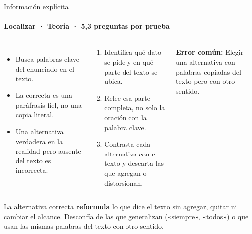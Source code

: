 \documentclass[aspectratio=169,11pt]{beamer}
\newlength{\ajustealto}
\newenvironment{ajustar}[1][0.74\textheight]
  {\setlength{\ajustealto}{#1}\begin{lrbox}{\ajustecaja}\begin{minipage}{\textwidth}}
  {\end{minipage}\end{lrbox}%
   \ifdim\dimexpr\ht\ajustecaja+\dp\ajustecaja\relax>\ajustealto
     \resizebox*{!}{\ajustealto}{\usebox{\ajustecaja}}\else\usebox{\ajustecaja}\fi}
\begin{document}
\begin{frame}{Información explícita}
\label{tema-cl-localizar}
\framesubtitle{Localizar · Teoría · 5,3 preguntas por prueba}
\begin{ajustar}
\begin{columns}[T,onlytextwidth]
\begin{itemize}\footnotesize
\item Busca palabras clave del enunciado en el texto.
\item La correcta es una paráfrasis fiel, no una copia literal.
\item Una alternativa verdadera en la realidad pero ausente del texto es incorrecta.
\end{itemize}
\begin{cajaregla}\scriptsize \begin{enumerate}\item Identifica qué dato se pide y en qué parte del texto se ubica.\item Relee esa parte completa, no solo la oración con la palabra clave.\item Contrasta cada alternativa con el texto y descarta las que agregan o distorsionan.\end{enumerate}\end{cajaregla}
\begin{notagris}\scriptsize \textbf{Error común:} Elegir una alternativa con palabras copiadas del texto pero con otro sentido.\end{notagris}
\end{columns}
\begin{cajaclave}\footnotesize
La alternativa correcta \textbf{reformula} lo que dice el texto sin agregar, quitar ni cambiar el alcance. Desconfía de las que generalizan («siempre», «todos») o que usan las mismas palabras del texto con otro sentido.
\end{cajaclave}
\end{ajustar}
\end{frame}
\end{document}
